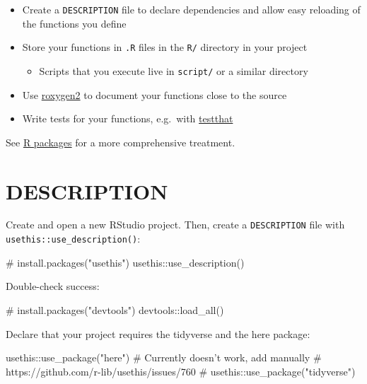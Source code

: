 \documentclass[]{book}
\newenvironment{Shaded}{}{}
\newcommand{\CommentTok}[1]{\textcolor[rgb]{0.00,0.50,0.00}{#1}}
\newcommand{\KeywordTok}[1]{\textcolor[rgb]{0.00,0.00,1.00}{#1}}
\newcommand{\NormalTok}[1]{#1}
\newcommand{\OperatorTok}[1]{#1}
\newcommand{\StringTok}[1]{\textcolor[rgb]{0.00,0.50,0.50}{#1}}
\providecommand{\tightlist}{%
  \setlength{\itemsep}{0pt}\setlength{\parskip}{0pt}}
\begin{document}
\begin{itemize}
\tightlist
\item
  Create a \texttt{DESCRIPTION} file to declare dependencies and allow easy reloading of the functions you define
\item
  Store your functions in \texttt{.R} files in the \texttt{R/} directory in your project

  \begin{itemize}
  \tightlist
  \item
    Scripts that you execute live in \texttt{script/} or a similar directory
  \end{itemize}
\item
  Use \href{https://github.com/klutometis/roxygen}{roxygen2} to document your functions close to the source
\item
  Write tests for your functions, e.g.~with \href{https://testthat.r-lib.org/}{testthat}
\end{itemize}

See \href{http://r-pkgs.had.co.nz/}{R packages} for a more comprehensive treatment.

\hypertarget{description}{%
\section{DESCRIPTION}\label{description}}

Create and open a new RStudio project.
Then, create a \texttt{DESCRIPTION} file with \texttt{usethis::use\_description()}:

\begin{Shaded}
\begin{Highlighting}[]
\CommentTok{# install.packages("usethis")}
\NormalTok{usethis}\OperatorTok{::}\KeywordTok{use_description}\NormalTok{()}
\end{Highlighting}
\end{Shaded}

Double-check success:

\begin{Shaded}
\begin{Highlighting}[]
\CommentTok{# install.packages("devtools")}
\NormalTok{devtools}\OperatorTok{::}\KeywordTok{load_all}\NormalTok{()}
\end{Highlighting}
\end{Shaded}

Declare that your project requires the tidyverse and the here package:

\begin{Shaded}
\begin{Highlighting}[]
\NormalTok{usethis}\OperatorTok{::}\KeywordTok{use_package}\NormalTok{(}\StringTok{"here"}\NormalTok{)}
\CommentTok{# Currently doesn't work, add manually}
\CommentTok{# https://github.com/r-lib/usethis/issues/760}
\CommentTok{# usethis::use_package("tidyverse")}
\end{Highlighting}
\end{Shaded}
\end{document}

